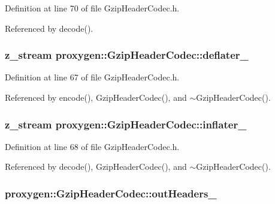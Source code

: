 Definition at line 70 of file Gzip\+Header\+Codec.\+h.



Referenced by decode().

\subsubsection[{deflater\+\_\+}]{\setlength{\rightskip}{0pt plus 5cm}z\+\_\+stream proxygen\+::\+Gzip\+Header\+Codec\+::deflater\+\_\+\hspace{0.3cm}{\ttfamily [private]}}\label{classproxygen_1_1GzipHeaderCodec_a86c3fd17d4adafd880e0a86de59c4780}


Definition at line 67 of file Gzip\+Header\+Codec.\+h.



Referenced by encode(), Gzip\+Header\+Codec(), and $\sim$\+Gzip\+Header\+Codec().

\subsubsection[{inflater\+\_\+}]{\setlength{\rightskip}{0pt plus 5cm}z\+\_\+stream proxygen\+::\+Gzip\+Header\+Codec\+::inflater\+\_\+\hspace{0.3cm}{\ttfamily [private]}}\label{classproxygen_1_1GzipHeaderCodec_ab7be5cf6ac428f223714b701813693dd}


Definition at line 68 of file Gzip\+Header\+Codec.\+h.



Referenced by decode(), Gzip\+Header\+Codec(), and $\sim$\+Gzip\+Header\+Codec().

\subsubsection[{out\+Headers\+\_\+}]{ proxygen\+::\+Gzip\+Header\+Codec\+::out\+Headers\+\_\+\hspace{0.3cm}{\ttfamily [private]}}\label{classproxygen_1_1GzipHeaderCodec_a7df782fe5f62c44b61a8f5e8da935ff5}



